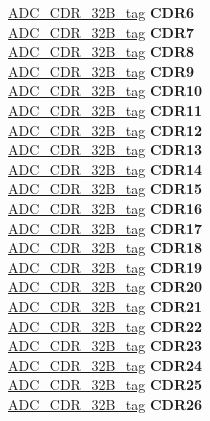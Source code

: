 \begin{DoxyCompactItemize}
\begin{tabbing}
\>\>\mbox{\hyperlink{unionADC__CDR__32B__tag}{ADC\_CDR\_32B\_tag}} {\bfseries CDR6}\\
\>\>\mbox{\hyperlink{unionADC__CDR__32B__tag}{ADC\_CDR\_32B\_tag}} {\bfseries CDR7}\\
\>\>\mbox{\hyperlink{unionADC__CDR__32B__tag}{ADC\_CDR\_32B\_tag}} {\bfseries CDR8}\\
\>\>\mbox{\hyperlink{unionADC__CDR__32B__tag}{ADC\_CDR\_32B\_tag}} {\bfseries CDR9}\\
\>\>\mbox{\hyperlink{unionADC__CDR__32B__tag}{ADC\_CDR\_32B\_tag}} {\bfseries CDR10}\\
\>\>\mbox{\hyperlink{unionADC__CDR__32B__tag}{ADC\_CDR\_32B\_tag}} {\bfseries CDR11}\\
\>\>\mbox{\hyperlink{unionADC__CDR__32B__tag}{ADC\_CDR\_32B\_tag}} {\bfseries CDR12}\\
\>\>\mbox{\hyperlink{unionADC__CDR__32B__tag}{ADC\_CDR\_32B\_tag}} {\bfseries CDR13}\\
\>\>\mbox{\hyperlink{unionADC__CDR__32B__tag}{ADC\_CDR\_32B\_tag}} {\bfseries CDR14}\\
\>\>\mbox{\hyperlink{unionADC__CDR__32B__tag}{ADC\_CDR\_32B\_tag}} {\bfseries CDR15}\\
\>\>\mbox{\hyperlink{unionADC__CDR__32B__tag}{ADC\_CDR\_32B\_tag}} {\bfseries CDR16}\\
\>\>\mbox{\hyperlink{unionADC__CDR__32B__tag}{ADC\_CDR\_32B\_tag}} {\bfseries CDR17}\\
\>\>\mbox{\hyperlink{unionADC__CDR__32B__tag}{ADC\_CDR\_32B\_tag}} {\bfseries CDR18}\\
\>\>\mbox{\hyperlink{unionADC__CDR__32B__tag}{ADC\_CDR\_32B\_tag}} {\bfseries CDR19}\\
\>\>\mbox{\hyperlink{unionADC__CDR__32B__tag}{ADC\_CDR\_32B\_tag}} {\bfseries CDR20}\\
\>\>\mbox{\hyperlink{unionADC__CDR__32B__tag}{ADC\_CDR\_32B\_tag}} {\bfseries CDR21}\\
\>\>\mbox{\hyperlink{unionADC__CDR__32B__tag}{ADC\_CDR\_32B\_tag}} {\bfseries CDR22}\\
\>\>\mbox{\hyperlink{unionADC__CDR__32B__tag}{ADC\_CDR\_32B\_tag}} {\bfseries CDR23}\\
\>\>\mbox{\hyperlink{unionADC__CDR__32B__tag}{ADC\_CDR\_32B\_tag}} {\bfseries CDR24}\\
\>\>\mbox{\hyperlink{unionADC__CDR__32B__tag}{ADC\_CDR\_32B\_tag}} {\bfseries CDR25}\\
\>\>\mbox{\hyperlink{unionADC__CDR__32B__tag}{ADC\_CDR\_32B\_tag}} {\bfseries CDR26}\\

\end{tabbing}
\end{DoxyCompactItemize}
